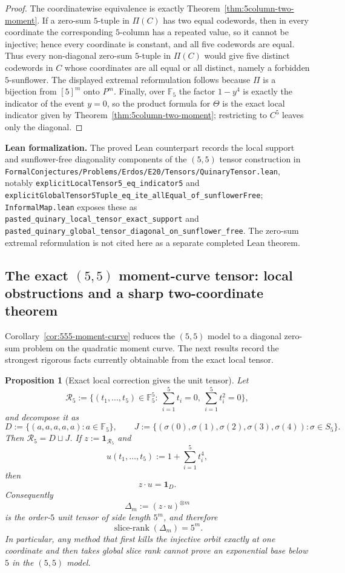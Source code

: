 \documentclass[11pt]{article}
\newtheorem{proposition}[theorem]{Proposition}
\theoremstyle{definition}
\newcommand{\1}{\mathbf{1}}
\newcommand{\leannote}[1]{\par\smallskip\noindent\textbf{Lean formalization.} #1\par\smallskip}
\begin{document}
\begin{proof}
The coordinatewise equivalence is exactly Theorem~\ref{thm:5column-two-moment}. If a zero-sum $5$-tuple in $\Pi(C)$ has two equal codewords, then in every coordinate the corresponding $5$-column has a repeated value, so it cannot be injective; hence every coordinate is constant, and all five codewords are equal. Thus every non-diagonal zero-sum $5$-tuple in $\Pi(C)$ would give five distinct codewords in $C$ whose coordinates are all equal or all distinct, namely a forbidden $5$-sunflower. The displayed extremal reformulation follows because $\Pi$ is a bijection from $[5]^m$ onto $P^m$. Finally, over $\mathbb F_5$ the factor $1-y^4$ is exactly the indicator of the event $y=0$, so the product formula for $\Theta$ is the exact local indicator given by Theorem~\ref{thm:5column-two-moment}; restricting to $C^5$ leaves only the diagonal.
\end{proof}

\leannote{The proved Lean counterpart records the local support and sunflower-free diagonality components of the \((5,5)\) tensor construction in \texttt{FormalConjectures/Problems/Erdos/E20/Tensors/QuinaryTensor.lean}, notably \texttt{explicitLocalTensor5\_eq\_indicator5} and \texttt{explicitGlobalTensor5Tuple\_eq\_ite\_allEqual\_of\_sunflowerFree}; \texttt{InformalMap.lean} exposes these as \texttt{pasted\_quinary\_local\_tensor\_exact\_support} and \texttt{pasted\_quinary\_global\_tensor\_diagonal\_on\_sunflower\_free}. The zero-sum extremal reformulation is not cited here as a separate completed Lean theorem.}

\subsection*{The exact $(5,5)$ moment-curve tensor: local obstructions and a sharp two-coordinate theorem}
Corollary~\ref{cor:555-moment-curve} reduces the $(5,5)$ model to a diagonal zero-sum problem on the quadratic moment curve. The next results record the strongest rigorous facts currently obtainable from the exact local tensor.

\begin{proposition}[Exact local correction gives the unit tensor]\label{prop:555-unit-tensor}
Let
\[
\mathcal R_5:=\{(t_1,\dots,t_5)\in \mathbb F_5^5:\ \sum_{i=1}^5 t_i=0,\ \sum_{i=1}^5 t_i^2=0\},
\]
and decompose it as
\[
D:=\{(a,a,a,a,a):a\in \mathbb F_5\},
\qquad
J:=\{(\sigma(0),\sigma(1),\sigma(2),\sigma(3),\sigma(4)):\sigma\in S_5\}.
\]
Then $\mathcal R_5=D\sqcup J$. If $z:=\mathbf 1_{\mathcal R_5}$ and
\[
u(t_1,\dots,t_5):=1+\sum_{i=1}^5 t_i^4,
\]
then
\[
z\cdot u=\mathbf 1_D.
\]
Consequently
\[
\Delta_m:=(z\cdot u)^{\otimes m}
\]
is the order-$5$ unit tensor of side length $5^m$, and therefore
\[
\operatorname{slice\text{-}rank}(\Delta_m)=5^m.
\]
In particular, any method that first kills the injective orbit exactly at one coordinate and then takes global slice rank cannot prove an exponential base below $5$ in the $(5,5)$ model.
\end{proposition}
\end{document}
